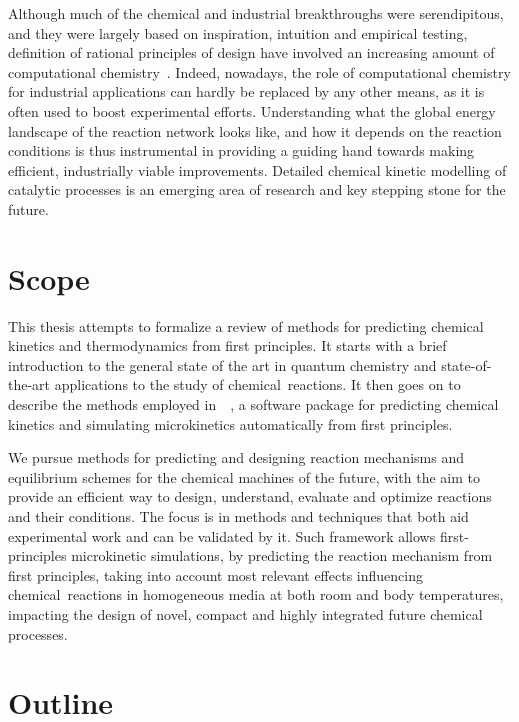Although much of the chemical and industrial breakthroughs were serendipitous,
and they were largely based on inspiration,
intuition and empirical testing,
definition of rational principles of design have involved an increasing amount of computational
chemistry~\cite{Kitchin_2012}.
Indeed,
nowadays,
the role of computational chemistry for industrial applications can
hardly be replaced by any other means,
as it is often used to boost experimental efforts.
Understanding what the global energy landscape of the reaction network looks like,
and how it depends on the reaction conditions is thus instrumental in providing a guiding hand towards making efficient,
industrially viable improvements.
Detailed chemical kinetic modelling of catalytic processes is an emerging area of research and key stepping stone for the future.

\section*{Scope}%
\label{sec:scope}

This thesis attempts to formalize a review of methods for predicting chemical
kinetics and thermodynamics from first principles.
It starts with a brief introduction to the general state of the art in quantum
chemistry and state-of-the-art applications to the study of chemical~reactions.
It then goes on to describe the methods employed in~\overreact{}~\cite{Schneider_2022},
a software
package for predicting chemical kinetics and simulating microkinetics
automatically from first principles.

We pursue methods for predicting and designing reaction mechanisms
and equilibrium schemes for the chemical machines of the future,
with the aim to provide an efficient way to design,
understand,
evaluate and optimize reactions and their conditions.
The focus is in methods and techniques that both aid experimental work and can be validated by it.
Such framework allows first-principles microkinetic simulations,
by predicting the reaction mechanism from first principles,
taking into account most relevant effects influencing
chemical~reactions in homogeneous media at both room and body temperatures,
impacting the design of novel,
compact and highly integrated future chemical processes.

\section*{Outline}%
\label{sec:outline}

